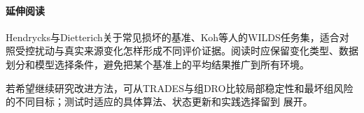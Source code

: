 \paragraph{延伸阅读}

Hendrycks与Dietterich关于常见损坏的基准、Koh等人的WILDS任务集，适合对照受控扰动与真实来源变化怎样形成不同评价证据。阅读时应保留变化类型、数据划分和模型选择条件，避免把某个基准上的平均结果推广到所有环境。

若希望继续研究改进方法，可从TRADES与组DRO比较局部稳定性和最坏组风险的不同目标；测试时适应的具体算法、状态更新和实践选择留到
展开。
